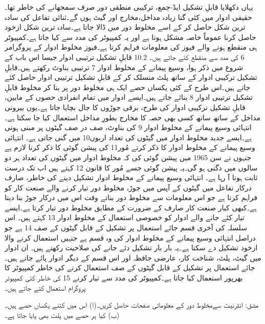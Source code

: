 	یہاں دکھلایا قابلِ تشکیل ایڈ-جمع، ترکیبی منطقی دور صرف سمجھانے کی خاطر تھا۔حقیقی ادوار میں کئی گنا زیادہ مداخل،مخارج اور گیٹ ہوں گے۔ثنائی تفاعل کی سادہ ترین شکل حاصل کر کے اسے مخلوط دور میں ڈالا جاتا ہے۔سادہ ترین شکل ازخود حاصل کرنا عموماً خاصہ مشکل ہوتا ہے اور یہ  کمپیوٹر کی مدد سے کیا جاتا ہے۔کمپیوٹر ہی منقطع ہونے والے فیوز کی معلومات فراہم کرتا ہے۔فیوز مخلوط ادوار کے پروگرامر 6 کی مدد سے منقطع کئے جاتے ہیں۔
10.2 قابلِ تشکیل ترتیبی ادوار
	جیسا اس باب کے شروع میں ذکر ہوا، وسیع پیمانے کے مخلوط ادوار 7 ترتیبی بناوٹ رکھتے ہیں۔قابلِ تشکیل ترکیبی ادوار کے ساتھ پلٹ منسلک کر کے قابلِ تشکیل ترتیبی ادوار حاصل کئے جاتے ہیں۔اس طرح کے کئی یکساں حصے ایک ہی مخلوط دور پر بنا کر مخلوط قابلِ تشکیل ترتیبی ادوار 8 بنائے جاتے ہیں۔ایسے ادوار میں تمام انفرادی حصوں کے مابین، قابلِ تشکیل ترکیبی ادوار کی طرح، برقی جوڑوں کا جال بچایا جاتا ہے۔یوں بیرونی مداخل کے ساتھ ساتھ کسی بھی حصہ کا مخارج بطورِ مداخل استعمال کیا جا سکتا ہے۔
	انتہائی وسیع پیمانے کے مخلوط ادوار 9 کی بناوٹ، صف در صف گیٹوں پر مبنی ہوتی ہے۔ایسے جدید مخلوط ادوار میں گیٹوں کی تعداد اربوں10 میں گنی جاتی ہے۔
	انتہائی وسیع پیمانے کے مخلوط ادوار کا ذکر کرتے مُور11 کی پیشن گوئی کا ذکر کرنا لازم ہے جنہوں نے سن 1965 میں پیشن گوئی کی کہ مخلوط ادوار میں گیٹوں کی تعداد ہر دو سالوں میں دگنی ہو گی۔یہ پیشن گوئی جسے مُور کا قانون 12 کہتے ہیں اب تک درست ثابت ہوتا آ رہا ہے۔
	انتہائی وسیع پیمانے کے مخلوط ادوار تشکیل دینے کی خاطر، صارف درکار تفاعل میں گیٹوں کے آپس میں جوڑ، مخلوط دور تیار کرنے والے صنعت کار کو فراہم کرتا ہے جو اس معلومات سے مخلوط دور بناتے وقت اس میں درکار جوڑ بنا دیتا ہے۔کبھی کبار صنعت کار صارف کے ضرورت کے مطابق مخلوط دور تیار کرتا ہے۔ایسے تیار کئے جانے والے ادوار کو خصوصی استعمال کے مخلوط ادوار  13 کہتے ہیں۔
	اس سلسلہ کی آخری قسم جائے استعمال پر تشکیل کے قابل گیٹوں کے صف 14 ہے جو دراصل انتہائی وسیع پیمانے کے مخلوط ادوار کی وہ قسم ہے جنہیں استعمال کرنے والا ازخود تشکیل دے سکتا ہے۔یہ بار بار تشکیل دئے جانے کی صلاحیت رکھتے ہیں۔
	ان  ادوار میں گیٹ، پلٹ، شناخت کار، عارضی حافظہ اور اس قسم کے دیگر ادوار پائے جاتے ہیں۔جائے استعمال پر تشکیل کے قابل گیٹوں کے صف استعمال کرنے کی خاطر کمپیوٹر کا بھرپور استعمال کیا جاتا ہے۔کمپیوٹر کی مدد سے تیار کرنے 15 کی خاطر کئی کمپیوٹر پروگرام استعمال کئے جاتے ہیں۔ 

مشق:	انٹرنیٹ سےمخلوط دور کے معلوماتی صفحات حاصل کریں۔(ا) اس میں کتنے یکساں حصے ہیں۔ (ب) کیا ہر حصے میں پلٹ بھی پایا جاتا ہے۔
